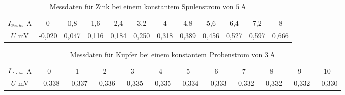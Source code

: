 \begin{table}
 \centering
 \begin{tabular}[width=\textwidth]{S| S[table-format=2.2] S[table-format=1.3] S[table-format=1.3] S[table-format=1.3] S[table-format=1.3] S[table-format=1.3] S[table-format=1.3] S[table-format=1.3] S[table-format=1.3] S[table-format=1.3] S[table-format=1.3]}
     \midrule
      $I_{\text{\tiny{Probe}}}$  \si{\ampere} & 0 & 0,8 & 1,6 & 2,4 & 3,2 & 4 & 4,8 & 5,6 & 6,4 & 7,2 & 8 \\
      $U$  \si{\milli\volt} & -0,020 & 0,047 & 0,116 & 0,184 & 0,250 & 0,318 & 0,389 & 0,456 & 0,527 & 0,597 & 0,666 \\
      \bottomrule
\end{tabular}
  \caption{Messdaten für Zink bei einem konstantem Spulenstrom von $\SI{5}{\ampere}$}
  \label{tab:Zink_U_H_2_umgepolt}
\end{table}


\begin{table}
 \centering
 \begin{tabular}[width=\textwidth]{S| S[table-format=2.3] S[table-format=1.3] S[table-format=1.3] S[table-format=1.3] S[table-format=1.3] S[table-format=1.3] S[table-format=1.3] S[table-format=1.3] S[table-format=1.3] S[table-format=1.3] S[table-format=1.3]}
     \midrule
      $I_{\text{\tiny{Probe}}}$  \si{\ampere} & 0 & 1 & 2 & 3 & 4 & 5 & 6 & 7 & 8 & 9 & 10 \\
      $U$  \si{\milli\volt} & - 0,338  & - 0,337 & - 0,336 & - 0,335 & - 0,335 & - 0,334 & - 0,333 & - 0,332 & - 0,332 & - 0,332 & - 0,330 \\
      \bottomrule
\end{tabular}
  \caption{Messdaten für Kupfer bei einem konstantem Probenstrom von $\SI{3}{\ampere}$}
  \label{tab:Kupfer_U_H_2_umgepolt}
\end{table}
